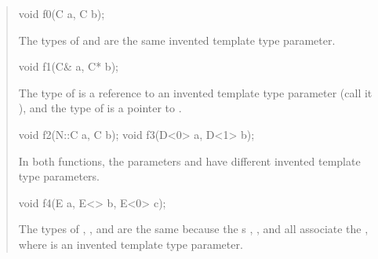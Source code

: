\begin{quote}
\begin{codeblock}
void f0(C a, C b);
\end{codeblock}
The types of  and  are the same invented template
type parameter.
% 
\begin{codeblock}
void f1(C& a, C* b);
\end{codeblock}
The type of  is a reference to an invented template type parameter 
(call it ), and the type of  is a pointer to 
.
% 
\begin{codeblock}
void f2(N::C a, C b);
void f3(D<0> a, D<1> b);
\end{codeblock}
In both functions, the parameters  and
 have different invented template type parameters.
% 
\begin{codeblock}
void f4(E a, E<> b, E<0> c);
\end{codeblock}
The types of , , and  are the same because the 
s , , and 
 all associate the 
, where  is an invented template type parameter.
\end{quote}

% 
% 
